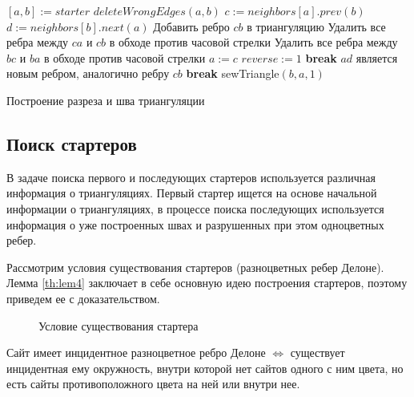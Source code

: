\documentclass[12pt]{article}
\newcommand{\Break}{\State \textbf{break} }
\begin{document}
\begin{algorithm}[htb!]
\begin{algorithmic}[1]
	\State $[a, b] := starter$
		\State $deleteWrongEdges(a, b)$
		\State $c := neighbors[a].prev(b)$
		\State $d := neighbors[b].next(a)$
			\State Добавить ребро $cb$ в триангуляцию 
			\State Удалить все ребра между $ca$ и $cb$ в обходе против часовой стрелки
			\State Удалить все ребра между $bc$ и $ba$ в обходе против часовой стрелки
				\State $a := c$
			\Else
				\State $reverse := 1$
				\Break
			\EndIf
		\ElsIf{$(\angle adb > \angle acb~\&~\angle adb < \pi) \vee (\angle adb < \pi~\&~\angle acb \ge \pi)$}
			\State $ad$ является новым ребром, аналогично ребру $cb$
		\Else
			\Break
		\EndIf
	\EndWhile
	\If{$reverse == 0$}
		\State sewTriangle$(b, a, 1)$
	\EndIf
\EndProcedure
\end{algorithmic}
\caption{Построение разреза и шва триангуляции}
\label{alg:sewTriangle}
\end{algorithm}

\subsection{Поиск стартеров}
В задаче поиска первого и последующих стартеров используется различная информация о триангуляциях.
Первый стартер ищется на основе начальной информации о триангуляциях,
в процессе поиска последующих используется информация о уже построенных швах и разрушенных при этом одноцветных ребер.

Рассмотрим условия существования стартеров (разноцветных ребер Делоне).
Лемма \ref{th:lem4} \cite{MestOverlap} заключает в себе основную идею построения стартеров,
поэтому приведем ее с доказательством.

\begin{figure}[htb!]
	\caption{Условие существования стартера}
	\label{pic:starterLemma}
\end{figure}

\begin{lemma}
\label{th:lem4}
Сайт имеет инцидентное разноцветное ребро Делоне $\Leftrightarrow$ существует инцидентная ему окружность, внутри которой нет сайтов одного с ним цвета, но есть сайты противоположного цвета на ней или внутри нее.
\end{lemma}
\end{document}
